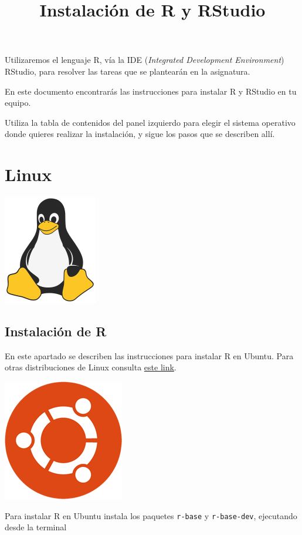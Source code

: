 \documentclass[
  degree=mecinf,
  title=normal,
  toc=normal,
  bib=normal]{mnye}
\title{Instalación de R y RStudio}
\begin{document}

\hypertarget{section}{%
\section*{}\label{section}}

Utilizaremos el lenguaje \textsf{R}, vía la IDE (\emph{Integrated Development Environment}) \textsf{RStudio}, para resolver las tareas que se plantearán en la asignatura.

En este documento encontrarás las instrucciones para instalar R y RStudio en tu equipo.

Utiliza la tabla de contenidos del panel izquierdo para elegir el sistema operativo donde quieres realizar la instalación, y sigue los pasos que se describen allí.

\hypertarget{linux}{%
\section{Linux}\label{linux}}

\begin{center}\includegraphics[width=0.15\linewidth]{images/os/tux-flat} \end{center}

\hypertarget{instalaciuxf3n-de-r}{%
\subsection{Instalación de R}\label{instalaciuxf3n-de-r}}

En este apartado se describen las instrucciones para instalar R en Ubuntu. Para otras distribuciones de Linux consulta \href{https://ftp.cixug.es/CRAN/bin/linux/}{este link}.

\begin{center}\includegraphics[width=0.15\linewidth]{images/os/ubuntu} \end{center}

Para instalar R en Ubuntu instala los paquetes \texttt{r-base} y \texttt{r-base-dev}, ejecutando desde la terminal
\end{document}
